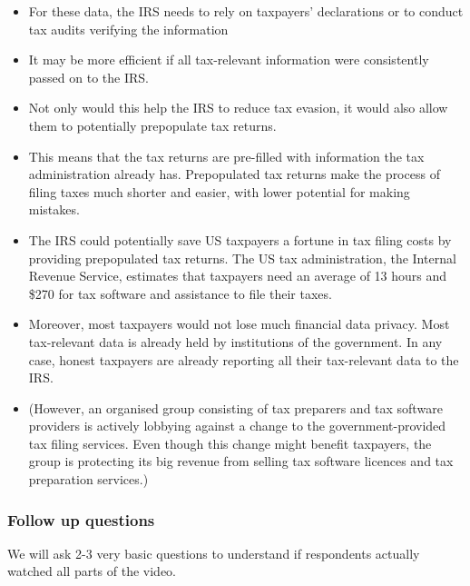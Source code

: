 \documentclass[11pt]{article}
\begin{document}
\begin{itemize}
    \item For these data, the IRS needs to rely on taxpayers’ declarations or to conduct tax audits verifying the information
    \item It may be more efficient if all tax-relevant information were consistently passed on to the IRS.
    \item Not only would this help the IRS to reduce tax evasion, it would also allow them to potentially prepopulate tax returns. 
    \item This means that the tax returns are pre-filled with information the tax administration already has. Prepopulated tax returns make the process of filing taxes much shorter and easier, with lower potential for making mistakes.
    \item The IRS could potentially save US taxpayers a fortune in tax filing costs by providing prepopulated tax returns. The US tax administration, the Internal Revenue Service, estimates that taxpayers need an average of 13 hours and \$270 for tax software and assistance to file their taxes.
    \item Moreover, most taxpayers would not lose much financial data privacy. Most tax-relevant data is already held by institutions of the government. In any case, honest taxpayers are already reporting all their tax-relevant data to the IRS. 
     \item (However, an organised group consisting of tax preparers and tax software providers is actively lobbying against a change to the government-provided tax filing services. Even though this change might benefit taxpayers, the group is protecting its big revenue from selling tax software licences and tax preparation services.)
\end{itemize}
\subsubsection*{Follow up questions}
We will ask 2-3 very basic questions to understand if respondents actually watched all parts of the video.

\newpage
\printbibliography
\end{document}
